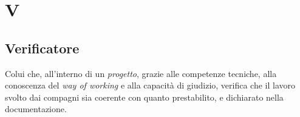 \chapter{V}

\section{Verificatore}\label{sec:Verificatori}
Colui che, all'interno di un \emph{progetto}, grazie alle competenze tecniche, alla conoscenza del \emph{way of working} e alla capacità di giudizio, verifica che il lavoro svolto dai compagni sia coerente con quanto prestabilito, e dichiarato nella documentazione.
